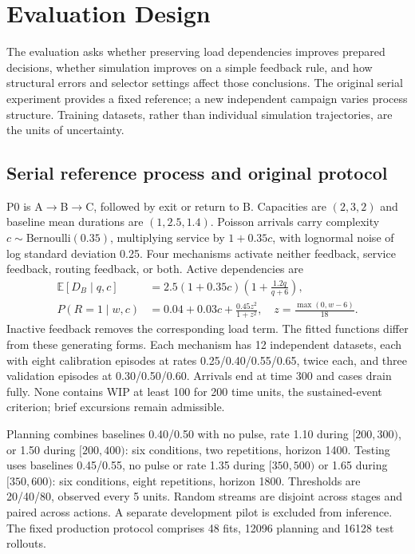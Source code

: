 \section{Evaluation Design}
The evaluation asks whether preserving load dependencies improves prepared decisions, whether simulation improves on a simple feedback rule, and how structural errors and selector settings affect those conclusions. The original serial experiment provides a fixed reference; a new independent campaign varies process structure. Training datasets, rather than individual simulation trajectories, are the units of uncertainty.

\subsection{Serial reference process and original protocol}
P0 is A$\rightarrow$B$\rightarrow$C, followed by exit or return to B. Capacities are $(2,3,2)$ and baseline mean durations are $(1,2.5,1.4)$. Poisson arrivals carry complexity $c\sim\mathrm{Bernoulli}(0.35)$, multiplying service by $1+0.35c$, with lognormal noise of log standard deviation 0.25. Four mechanisms activate neither feedback, service feedback, routing feedback, or both. Active dependencies are
\begin{align}\label{eq:truth}
\mathbb E[D_B\mid q,c]&=2.5(1+0.35c)\left(1+\frac{1.2q}{q+6}\right),\\
P(R=1\mid w,c)&=0.04+0.03c+\frac{0.45z^2}{1+z^2},\quad z=\frac{\max(0,w-6)}{18}.
\end{align}
Inactive feedback removes the corresponding load term. The fitted functions differ from these generating forms. Each mechanism has 12 independent datasets, each with eight calibration episodes at rates 0.25/0.40/0.55/0.65, twice each, and three validation episodes at 0.30/0.50/0.60. Arrivals end at time 300 and cases drain fully. None contains WIP at least 100 for 200 time units, the sustained-event criterion; brief excursions remain admissible.

Planning combines baselines 0.40/0.50 with no pulse, rate 1.10 during $[200,300)$, or 1.50 during $[200,400)$: six conditions, two repetitions, horizon 1400. Testing uses baselines 0.45/0.55, no pulse or rate 1.35 during $[350,500)$ or 1.65 during $[350,600)$: six conditions, eight repetitions, horizon 1800. Thresholds are 20/40/80, observed every 5 units. Random streams are disjoint across stages and paired across actions. A separate development pilot is excluded from inference. The fixed production protocol comprises 48 fits, 12096 planning and 16128 test rollouts.

